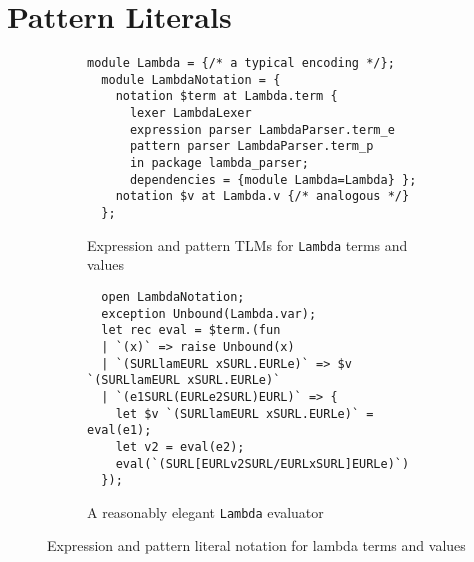 \documentclass[acmsmall,screen]{acmart}
\makeatletter
\renewcommand{\subsubsection}{%
  \@startsection{subsubsection}{3}%
  {\z@}{1ex \@plus .2ex \@minus .2ex}{-1em}%
  {\sffamily\normalsize\itshape\maybe@addperiod}%
}
\newcommand{\maybe@addperiod}[1]{%
  #1\@addpunct{.}%
}
\newcommand{\li}[1]{\lstinline[basicstyle=\ttfamily\fontsize{9pt}{1em}\selectfont]{#1}}
\newcommand{\lismall}[1]{\lstinline[basicstyle=\ttfamily\fontsize{9pt}{1em}\selectfont]{#1}}
\makeatother
\begin{document}



\section{Pattern Literals}
\label{sec:sptsms}

\begin{figure}[t]
\begin{subfigure}[t]{0.55\textwidth}
\begin{lstlisting}[morekeywords={expression}]
  module Lambda = {/* a typical encoding */};
  module LambdaNotation = {
    notation $term at Lambda.term { 
      lexer LambdaLexer
      expression parser LambdaParser.term_e
      pattern parser LambdaParser.term_p
      in package lambda_parser;
      dependencies = {module Lambda=Lambda} };
    notation $v at Lambda.v {/* analogous */}
  };
\end{lstlisting}
\vspace{-6px}
\caption{Expression and pattern TLMs for \lismall{Lambda} terms and values}
\label{fig:lam}
\vspace{2px}
\end{subfigure}
\hfill
\begin{subfigure}[t]{0.42\textwidth}
\begin{lstlisting}
  open LambdaNotation;
  exception Unbound(Lambda.var);
  let rec eval = $term.(fun 
  | `(x)` => raise Unbound(x)
  | `(SURLlamEURL xSURL.EURLe)` => $v `(SURLlamEURL xSURL.EURLe)`
  | `(e1SURL(EURLe2SURL)EURL)` => {
    let $v `(SURLlamEURL xSURL.EURLe)` = eval(e1);
    let v2 = eval(e2);
    eval(`(SURL[EURLv2SURL/EURLxSURL]EURLe)`) 
  });
\end{lstlisting}
\vspace{-6px}
\caption{A reasonably elegant \lismall{Lambda} evaluator}
\label{fig:lam-eval}
\end{subfigure}
\caption{Expression and pattern literal notation for lambda terms and values}
\vspace{-8px}
\label{fig:lam-example}
\end{figure}
\end{document}

